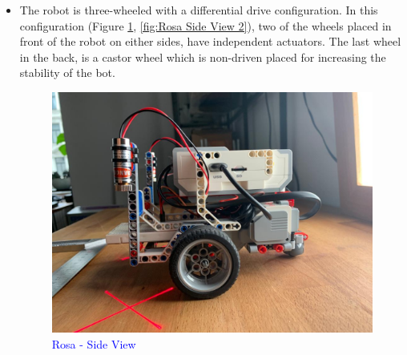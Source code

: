 {\begin{itemize}
        \item The robot is three-wheeled with a differential drive configuration. In this configuration (Figure \ref{fig:Rosa Side View}, \ref{fig:Rosa Side View 2}), two of the wheels placed in front of the robot on either sides, have independent actuators. The last wheel in the back, is a castor wheel which is non-driven placed for increasing the stability of the bot.
        
        \begin{figure}[!ht] %
            \centering
            \includegraphics[scale=0.3]{images/SideView.jpeg}
            \caption{\textcolor{blue}{Rosa - Side View}}
            \label{fig:Rosa Side View}
        \end{figure}
        

\end{itemize}}
